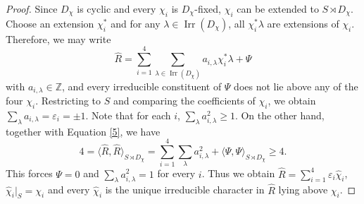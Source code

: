 \documentclass[11pt,a4paper]{article}
\numberwithin{equation}{section}
\theoremstyle{definition}
\theoremstyle{remark}
\newcommand{\Irr}{\operatorname{Irr}}
\begin{document}
\begin{proof}
Since $D_\chi$ is cyclic and every $\chi_i$ is $D_\chi$-fixed, $\chi_i$ can be extended to $S\rtimes D_\chi$. Choose an extension $\chi_i^*$ and  for any  $\lambda\in\Irr(D_\chi)$, all $\chi_i^*\lambda$ are extensions of $\chi_i$. Therefore, we may write
\[
\widehat{R}=\sum_{i=1}^4\sum_{\lambda\in\Irr(D_\chi)}a_{i,\lambda}\chi_i^*\lambda+\Psi
\]
with $a_{i,\lambda}\in\mathbb{Z}$, and every irreducible constituent of $\Psi$ does not lie above any of the four $\chi_i$.
Restricting to $S$ and comparing the coefficients of $\chi_i$, we obtain
$\sum_{\lambda}a_{i,\lambda}=\varepsilon_i=\pm 1$.
Note that for each $i$, $\sum_{\lambda}a_{i,\lambda}^2\ge 1$.
On the other hand, together with Equation \eqref{5}, we have
\[
4=\langle\widehat{R},\widehat{R}\rangle_{S\rtimes D_\chi}
=\sum_{i=1}^4\sum_{\lambda}a_{i,\lambda}^2+\langle \Psi,\Psi\rangle_{S\rtimes D_\chi}\ge 4.
\]
This forces $\Psi=0$ and $\sum_{\lambda}a_{i,\lambda}^2=1$ for every $i$. Thus we obtain 
$\widehat{R}=\sum_{i=1}^4\varepsilon_i\widehat{\chi}_i$,
$\widehat{\chi}_i\big|_S=\chi_i$ and every $\widehat{\chi}_i$ is the unique irreducible character in $\widehat{R}$ lying above $\chi_i$.


\end{proof}
\end{document}
